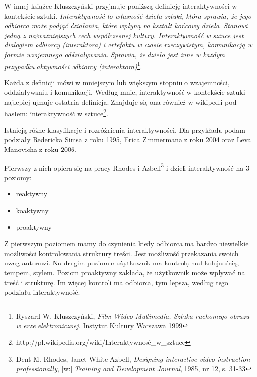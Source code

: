 \documentclass[a4paper,12pt,twoside]{article}
\begin{document}
W innej książce Kluszczyński przyjmuje poniższą definicję interaktywności
w kontekście sztuki.
\textit{Interaktywność to własność dzieła sztuki, która sprawia, że jego
odbiorca może podjąć działania, które wpłyną na kształt końcowy dzieła.
Stanowi jedną z najważniejszych cech współczesnej kultury. Interaktywność
w sztuce jest dialogiem odbiorcy (interaktora) i artefaktu w czasie
rzeczywistym, komunikacją w formie wzajemnego oddziaływania. Sprawia,
że dzieło jest inne w każdym przypadku aktywności odbiorcy
(interaktora)}\footnote{Ryszard W. Kluszczyński, \textit{Film-Wideo-Multimedia. Sztuka
ruchomego obrazu w erze elektronicznej.} Instytut Kultury Warszawa 1999}.

Każda z definicji mówi w mniejszym lub większym stopniu o wzajemności,
oddziaływaniu i komunikacji. Według mnie, interaktywność w kontekście
sztuki najlepiej ujmuje ostatnia definicja. Znajduje się ona również
w wikipedii pod hasłem: interaktywność
w sztuce\footnote{http://pl.wikipedia.org/wiki/Interaktywność\_w\_sztuce}.

Istnieją różne klasyfikacje i rozróżnienia interaktywności. Dla przykładu
podam podziały Redericka Simsa z roku 1995, Erica Zimmermana z roku 2004
oraz Leva Manovicha z roku 2006.

Pierwszy z nich opiera się na pracy Rhodes i Azbell\footnote{Dent M. Rhodes,
Janet White Azbell, \textit{Designing interactive video instruction
professionally}, [w:] \textit{Training and Development Journal}, 1985, nr 12,
s. 31-33} i dzieli interaktywność na 3 poziomy:
\begin{itemize}
\item reaktywny
\item koaktywny
\item proaktywny
\end{itemize}
Z pierwszym poziomem mamy do czynienia kiedy odbiorca ma bardzo niewielkie
możliwości kontrolowania struktury treści. Jest możliwość przekazania
swoich uwag autorowi. Na drugim poziomie użytkownik ma kontrolę nad
kolejnością, tempem, stylem. Poziom proaktywny zakłada, że użytkownik może
wpływać na treść i strukturę. Im więcej kontroli ma odbiorca, tym lepsza,
według tego podziału interaktywność. %
\end{document}

